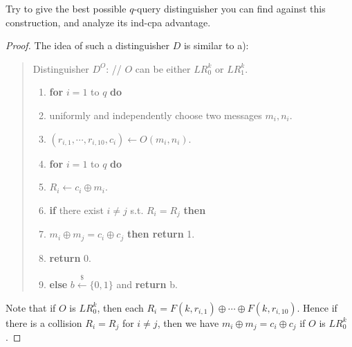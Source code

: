 \documentclass[12pt]{article}
\newcommand{\bits}{\{0,1\}}
\newcommand{\getsr}{\stackrel{\$}{\gets}}
\newcommand{\tab}{\hspace{0.3in}}
\theoremstyle{definition}
\begin{document}
Try to give the best possible $q$-query distinguisher you can find against this construction, and analyze its ind-cpa advantage.
\begin{proof}
The idea of such a distinguisher $D$ is similar to a):
\begin{quote}
Distinguisher $D^O$: // $O$ can be either $LR_0^k$ or $LR_1^k$.
\begin{enumerate}
\item {\bf for} $i=1$ to $q$ {\bf do}
\item \tab uniformly and independently choose two messages $m_i, n_i$.%
\item \tab $(r_{i,1}, \cdots, r_{i,10}, c_i) \gets O(m_i, n_i)$.
\item {\bf for} $i=1$ to $q$ {\bf do}
\item \tab $R_i \gets c_i \oplus m_i$.
\item {\bf if} there exist $i\not= j$ s.t. $R_i = R_j$ {\bf then}
\item \tab {\bf if} $m_i \oplus m_j = c_i \oplus c_j$ {\bf then return} 1.
\item \tab {\bf else} {\bf return} 0.
\item {\bf else} $b\getsr\bits$ and {\bf return} b.
\end{enumerate}
\end{quote}
Note that if $O$ is $LR_0^k$, then each $R_i = F(k, r_{i,1}) \oplus \cdots \oplus F(k, r_{i,10})$. Hence if there is a collision $R_i = R_j$ for $i \not= j$, then we have $m_i \oplus m_j = c_i \oplus c_j$ if $O$ is $LR_0^k$.


\end{proof}
\end{document}
